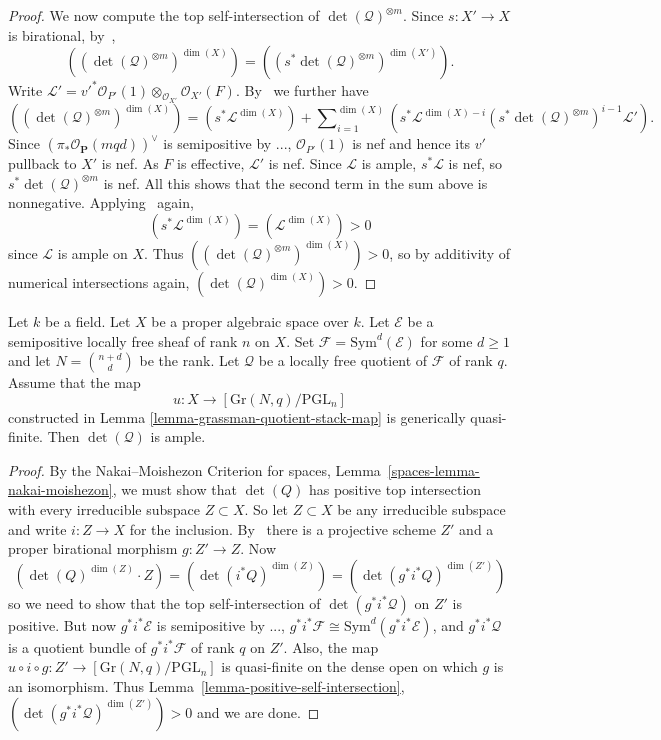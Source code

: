 \begin{proof}
We now compute the top self-intersection of $\det(\mathcal{Q})^{\otimes m}$.
Since $s : X' \to X$ is birational, by~,
$$
  ((\det(\mathcal{Q})^{\otimes m})^{\dim(X)})
    = ((s^*\det(\mathcal{Q})^{\otimes m})^{\dim(X')}).
$$
Write
$\mathcal{L}'
  = v'^*\mathcal{O}_{P'}(1) \otimes_{\mathcal{O}_{X'}} \mathcal{O}_{X'}(F)$.
By~ we further have
$$
  ((\det(\mathcal{Q})^{\otimes m})^{\dim(X)})
    = (s^*\mathcal{L}^{\dim(X)})
      + \sum\nolimits_{i = 1}^{\dim(X)}
          (s^*\mathcal{L}^{\dim(X) - i} (s^*\det(\mathcal{Q})^{\otimes m})^{i - 1} \mathcal{L}').
$$
Since $(\pi_*\mathcal{O}_{\mathbf{P}}(mqd))^\vee$ is semipositive by
...,
$\mathcal{O}_{P'}(1)$ is nef and hence its $v'$ pullback to $X'$ is nef.
As $F$ is effective, $\mathcal{L}'$ is nef.
Since $\mathcal{L}$ is ample, $s^*\mathcal{L}$ is nef, so
$s^*\det(\mathcal{Q})^{\otimes m}$ is nef.
All this shows that the second term in the sum above is nonnegative.
Applying~ again,
$$
  (s^*\mathcal{L}^{\dim(X)}) = (\mathcal{L}^{\dim(X)}) > 0
$$
since $\mathcal{L}$ is ample on $X$.
Thus $((\det(\mathcal{Q})^{\otimes m})^{\dim(X)}) > 0$, so by additivity of
numerical intersections again, $(\det(\mathcal{Q})^{\dim(X)}) > 0$.
\end{proof}

\begin{lemma}
\label{lemma-ampleness-of-semipos-quotients}
Let $k$ be a field.
Let $X$ be a proper algebraic space over $k$.
Let $\mathcal{E}$ be a semipositive locally free sheaf of rank $n$ on $X$.
Set $\mathcal{F} = \mathrm{Sym}^d(\mathcal{E})$ for some $d \geq 1$ and
let $N = \binom{n + d}{d}$ be the rank.
Let $\mathcal{Q}$ be a locally free quotient of $\mathcal{F}$ of rank $q$.
Assume that the map
$$
u : X \to [\mathrm{Gr}(N,q)/\mathrm{PGL}_n]
$$
constructed in Lemma \ref{lemma-grassman-quotient-stack-map}
is generically quasi-finite.
Then $\det(\mathcal{Q})$ is ample.
\end{lemma}

\begin{proof}
By the Nakai--Moishezon Criterion for spaces,
Lemma~\ref{spaces-lemma-nakai-moishezon},
we must show that $\det(Q)$ has positive top intersection with every
irreducible subspace $Z \subset X$.
So let $Z \subset X$ be any irreducible subspace and write $i : Z \to X$ for
the inclusion.
By~ there is a projective scheme $Z'$ and a proper birational
morphism $g : Z' \to Z$.
Now
$$
  (\det(Q)^{\dim(Z)} \cdot Z)
    = (\det(i^*Q)^{\dim(Z)})
    = (\det(g^*i^*Q)^{\dim(Z')})
$$
so we need to show that the top self-intersection of $\det(g^*i^*\mathcal{Q})$
on $Z'$ is positive.
But now $g^*i^*\mathcal{E}$ is semipositive by ...,
$g^*i^*\mathcal{F} \cong \mathrm{Sym}^d(g^*i^*\mathcal{E})$,
and $g^*i^*\mathcal{Q}$ is a quotient bundle of $g^*i^*\mathcal{F}$ of rank $q$
on $Z'$.
Also, the map $u \circ i \circ g : Z' \to [\mathrm{Gr}(N,q)/\mathrm{PGL}_n]$
is quasi-finite on the dense open on which $g$ is an isomorphism.
Thus Lemma~\ref{lemma-positive-self-intersection},
$(\det(g^*i^*\mathcal{Q})^{\dim(Z')}) > 0$ and we are done.
\end{proof}


